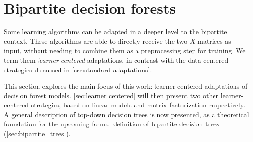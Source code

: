



\section{Bipartite decision forests}
\label{sec:bipartite forests}


Some learning algorithms can be adapted in a deeper level to the bipartite context. These algorithms are able to directly receive the two $X$ matrices as input, without needing to combine them as a preprocessing step for training.  %
We term them \emph{learner-centered} adaptations, in contrast with the data-centered strategies discussed in \autoref{sec:standard adaptations}.  %


This section explores the main focus of this work: learner-centered adaptations of decision forest models. \autoref{sec:learner centered} will then present two other learner-centered strategies, based on linear models and matrix factorization respectively.
%
A general description of top-down decision trees is now presented, as a theoretical foundation for the upcoming formal definition of bipartite decision trees (\autoref{sec:bipartite_trees}). %


